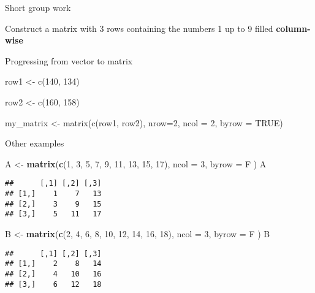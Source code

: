 \documentclass[
  ignorenonframetext,
]{beamer}
\newenvironment{Shaded}{\begin{snugshade}}{\end{snugshade}}
\newcommand{\DataTypeTok}[1]{\textcolor[rgb]{0.13,0.29,0.53}{#1}}
\newcommand{\DecValTok}[1]{\textcolor[rgb]{0.00,0.00,0.81}{#1}}
\newcommand{\KeywordTok}[1]{\textcolor[rgb]{0.13,0.29,0.53}{\textbf{#1}}}
\newcommand{\NormalTok}[1]{#1}
\newcommand{\StringTok}[1]{\textcolor[rgb]{0.31,0.60,0.02}{#1}}
\begin{document}
\begin{frame}{Short group work}
\protect\hypertarget{short-group-work-2}{}

Construct a matrix with 3 rows containing the numbers 1 up to 9 filled
\textbf{column-wise}

\end{frame}

\begin{frame}[fragile]{Progressing from vector to matrix}

row1 <- c(140, 134)

row2  <- c(160, 158)

my\_matrix <- matrix(c(row1, row2), nrow=2, ncol = 2, byrow = TRUE)

\end{frame}


\begin{frame}[fragile]{Other examples}
\protect\hypertarget{other-examples}{}

\begin{Shaded}
\begin{Highlighting}[]
\NormalTok{A <-}\StringTok{ }\KeywordTok{matrix}\NormalTok{(}\KeywordTok{c}\NormalTok{(}\DecValTok{1}\NormalTok{, }\DecValTok{3}\NormalTok{, }\DecValTok{5}\NormalTok{, }\DecValTok{7}\NormalTok{, }\DecValTok{9}\NormalTok{, }\DecValTok{11}\NormalTok{, }\DecValTok{13}\NormalTok{, }\DecValTok{15}\NormalTok{, }\DecValTok{17}\NormalTok{),}
  \DataTypeTok{ncol =} \DecValTok{3}\NormalTok{,}
  \DataTypeTok{byrow =}\NormalTok{ F}
\NormalTok{)}
\NormalTok{A}
\end{Highlighting}
\end{Shaded}

\begin{verbatim}
##      [,1] [,2] [,3]
## [1,]    1    7   13
## [2,]    3    9   15
## [3,]    5   11   17
\end{verbatim}

\end{frame}

\begin{frame}[fragile]{}
\protect\hypertarget{section}{}

\begin{Shaded}
\begin{Highlighting}[]
\NormalTok{B <-}\StringTok{ }\KeywordTok{matrix}\NormalTok{(}\KeywordTok{c}\NormalTok{(}\DecValTok{2}\NormalTok{, }\DecValTok{4}\NormalTok{, }\DecValTok{6}\NormalTok{, }\DecValTok{8}\NormalTok{, }\DecValTok{10}\NormalTok{, }\DecValTok{12}\NormalTok{, }\DecValTok{14}\NormalTok{, }\DecValTok{16}\NormalTok{, }\DecValTok{18}\NormalTok{),}
  \DataTypeTok{ncol =} \DecValTok{3}\NormalTok{,}
  \DataTypeTok{byrow =}\NormalTok{ F}
\NormalTok{)}
\NormalTok{B}
\end{Highlighting}
\end{Shaded}

\begin{verbatim}
##      [,1] [,2] [,3]
## [1,]    2    8   14
## [2,]    4   10   16
## [3,]    6   12   18
\end{verbatim}

\end{frame}
\end{document}
